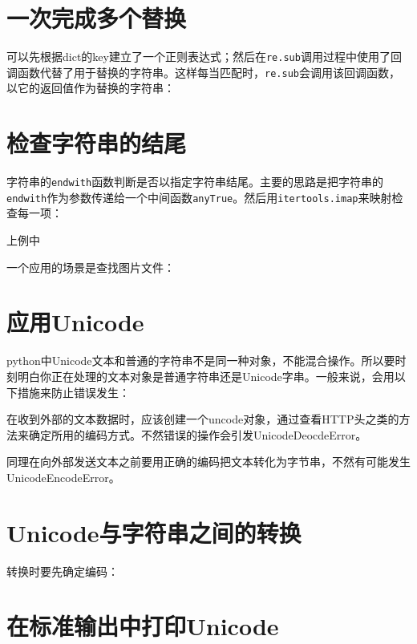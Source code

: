 	\section{一次完成多个替换}
		
		可以先根据dict的key建立了一个正则表达式；然后在\verb|re.sub|调用过程中使用了回调函数代替了用于替换的字符串。这样每当匹配时，\verb|re.sub|会调用该回调函数，以它的返回值作为替换的字符串：

		
		
	\section{检查字符串的结尾}
		
		字符串的\verb|endwith|函数判断是否以指定字符串结尾。主要的思路是把字符串的\verb|endwith|作为参数传递给一个中间函数\verb|anyTrue|。然后用\verb|itertools.imap|来映射检查每一项：

		

		上例中

		一个应用的场景是查找图片文件：

		

		
	\section{应用Unicode}

		python中Unicode文本和普通的字符串不是同一种对象，不能混合操作。所以要时刻明白你正在处理的文本对象是普通字符串还是Unicode字串。一般来说，会用以下措施来防止错误发生：

		在收到外部的文本数据时，应该创建一个uncode对象，通过查看HTTP头之类的方法来确定所用的编码方式。不然错误的操作会引发UnicodeDeocdeError。

		同理在向外部发送文本之前要用正确的编码把文本转化为字节串，不然有可能发生UnicodeEncodeError。
		
	\section{Unicode与字符串之间的转换}

		转换时要先确定编码：

		

	\section{在标准输出中打印Unicode}

